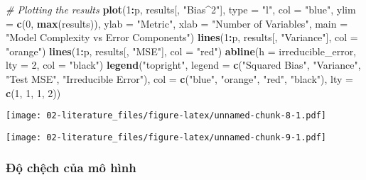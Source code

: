 \documentclass[
]{article}
\newenvironment{Shaded}{\begin{snugshade}}{\end{snugshade}}
\newcommand{\AttributeTok}[1]{\textcolor[rgb]{0.13,0.29,0.53}{#1}}
\newcommand{\CommentTok}[1]{\textcolor[rgb]{0.56,0.35,0.01}{\textit{#1}}}
\newcommand{\DecValTok}[1]{\textcolor[rgb]{0.00,0.00,0.81}{#1}}
\newcommand{\FunctionTok}[1]{\textcolor[rgb]{0.13,0.29,0.53}{\textbf{#1}}}
\newcommand{\NormalTok}[1]{#1}
\newcommand{\SpecialCharTok}[1]{\textcolor[rgb]{0.81,0.36,0.00}{\textbf{#1}}}
\newcommand{\StringTok}[1]{\textcolor[rgb]{0.31,0.60,0.02}{#1}}
\begin{document}
\begin{Shaded}
\begin{Highlighting}[]
\CommentTok{\# Plotting the results}
\FunctionTok{plot}\NormalTok{(}\DecValTok{1}\SpecialCharTok{:}\NormalTok{p, results[, }\StringTok{"Bias\^{}2"}\NormalTok{], }\AttributeTok{type =} \StringTok{"l"}\NormalTok{, }\AttributeTok{col =} \StringTok{"blue"}\NormalTok{, }\AttributeTok{ylim =} \FunctionTok{c}\NormalTok{(}\DecValTok{0}\NormalTok{, }\FunctionTok{max}\NormalTok{(results)), }\AttributeTok{ylab =} \StringTok{"Metric"}\NormalTok{, }\AttributeTok{xlab =} \StringTok{"Number of Variables"}\NormalTok{, }\AttributeTok{main =} \StringTok{"Model Complexity vs Error Components"}\NormalTok{)}
\FunctionTok{lines}\NormalTok{(}\DecValTok{1}\SpecialCharTok{:}\NormalTok{p, results[, }\StringTok{"Variance"}\NormalTok{], }\AttributeTok{col =} \StringTok{"orange"}\NormalTok{)}
\FunctionTok{lines}\NormalTok{(}\DecValTok{1}\SpecialCharTok{:}\NormalTok{p, results[, }\StringTok{"MSE"}\NormalTok{], }\AttributeTok{col =} \StringTok{"red"}\NormalTok{)}
\FunctionTok{abline}\NormalTok{(}\AttributeTok{h =}\NormalTok{ irreducible\_error, }\AttributeTok{lty =} \DecValTok{2}\NormalTok{, }\AttributeTok{col =} \StringTok{"black"}\NormalTok{)}
\FunctionTok{legend}\NormalTok{(}\StringTok{"topright"}\NormalTok{, }\AttributeTok{legend =} \FunctionTok{c}\NormalTok{(}\StringTok{"Squared Bias"}\NormalTok{, }\StringTok{"Variance"}\NormalTok{, }\StringTok{"Test MSE"}\NormalTok{, }\StringTok{"Irreducible Error"}\NormalTok{), }\AttributeTok{col =} \FunctionTok{c}\NormalTok{(}\StringTok{"blue"}\NormalTok{, }\StringTok{"orange"}\NormalTok{, }\StringTok{"red"}\NormalTok{, }\StringTok{"black"}\NormalTok{), }\AttributeTok{lty =} \FunctionTok{c}\NormalTok{(}\DecValTok{1}\NormalTok{, }\DecValTok{1}\NormalTok{, }\DecValTok{1}\NormalTok{, }\DecValTok{2}\NormalTok{))}
\end{Highlighting}
\end{Shaded}

\texttt{[image: 02-literature\_files/figure-latex/unnamed-chunk-8-1.pdf]}

\texttt{[image: 02-literature\_files/figure-latex/unnamed-chunk-9-1.pdf]}

\hypertarget{ux111ux1ed9-chux1ec7ch-cux1ee7a-muxf4-huxecnh}{%
\subsubsection{Độ chệch của mô hình}\label{ux111ux1ed9-chux1ec7ch-cux1ee7a-muxf4-huxecnh}}
\end{document}
